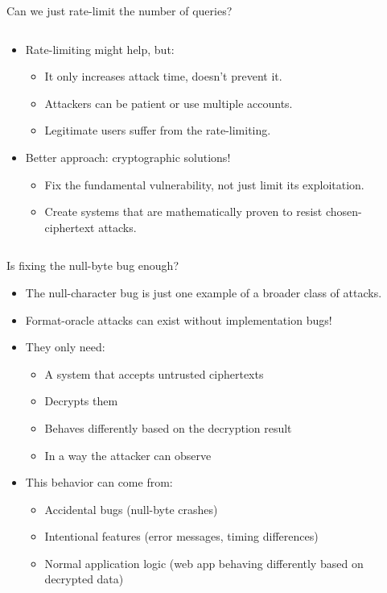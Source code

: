 \documentclass[aspectratio=169, lualatex, handout]{beamer}
\begin{document}
\begin{frame}{Can we just rate-limit the number of queries?}
	\begin{columns}[c]
		\begin{column}{0.6\textwidth}
			\begin{itemize}
				\item Rate-limiting might help, but:
				      \begin{itemize}
					      \item It only increases attack time, doesn't prevent it.
					      \item Attackers can be patient or use multiple accounts.
					      \item Legitimate users suffer from the rate-limiting.
				      \end{itemize}
				\item Better approach: cryptographic solutions!
				      \begin{itemize}
					      \item Fix the fundamental vulnerability, not just limit its exploitation.
					      \item Create systems that are mathematically proven to resist chosen-ciphertext attacks.
				      \end{itemize}
			\end{itemize}
		\end{column}
		\begin{column}{0.4\textwidth}
		\end{column}
	\end{columns}
\end{frame}

\begin{frame}{Is fixing the null-byte bug enough?}
	\begin{itemize}
		\item The null-character bug is just one example of a broader class of attacks.
		\item Format-oracle attacks can exist without implementation bugs!
		\item They only need:
		      \begin{itemize}
			      \item A system that accepts untrusted ciphertexts
			      \item Decrypts them
			      \item Behaves differently based on the decryption result
			      \item In a way the attacker can observe
		      \end{itemize}
		\item This behavior can come from:
		      \begin{itemize}
			      \item Accidental bugs (null-byte crashes)
			      \item Intentional features (error messages, timing differences)
			      \item Normal application logic (web app behaving differently based on decrypted data)
		      \end{itemize}
	\end{itemize}
\end{frame}
\end{document}
